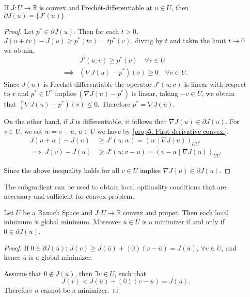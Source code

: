 \begin{theorem}
	If $J: U\rightarrow \overline{\mathbb{R}}$ is convex and Frech\'et-differentiable at $u\in U$, then $\partial J(u)=\lbrace J'(u)\rbrace$
	
	\begin{proof}
		Let $p^* \in \partial J(u)$. Then for each $t>0$, $J(u+tv)-J(u)\geq p^*(tv)=tp^*(v)$, diving by $t$ and takin the limit $t\rightarrow 0$ we obtain,
		\begin{align*}
			&J'(u;v) \geq p^*(v) \quad \forall v \in U \\
	\implies& (\nabla J(u)-p^*)(v) \geq 0 \quad \forall v \in U.
		\end{align*}
	Since $J(u)$ is Frech\'et differentiable the operator $J'(u;v)$ is linear with respect to $v$ and $p^* \in U^*$ implies $(\nabla J(u)-p^*)$ is linear, taking $-v \in U$, we obtain that $(\nabla J(u)-p^*)(v)\leq 0$. Therefore $p^*=\nabla J(u)$.
	
	On the other hand, if $J$ is differentiable, it follows that $\nabla J(u)\in \partial J(u)$. For $v\in U$, we set $w=v-u$, $u\in U$ we have by \eqref{prop5. First derivative convex.}, 
	\begin{align*}
		    J(u+w)-J(u)&\geq J'(u;w)=\left(w\mid \nabla J(u)\right)_{UU^*} \\
	\implies \ J(v)-J(u)&\geq J'(u; v-u) = \left(v-u \mid \nabla J(u)\right)_{UU^*}
	\end{align*}
	
	Since the above inequality holds for all $v \in U$ implies $\nabla J(u) \in \partial J(u)$.
	\end{proof}
\end{theorem}
\begin{remark}
	The subgradient can be used to obtain local optimality conditions that are necessary and sufficient for convex problem.
\end{remark}
\begin{theorem}
	Let $U$ be a Banach Space and $J: U \rightarrow \mathbb{R}$ convex and proper. Then each local minimum is global minimum.
	Moreover $\overline{u}\in U$ is a minimizer if and only if $0 \in \partial J(\overline{u})$.
	\begin{proof}
		If $0 \in \partial J(\overline{u})$: $J(v) \geq J(\overline{u})+ (0)(v-\overline{u})=J(\overline{u})$, $\forall v\in U$, and hence $\overline{u}$ is a global minimizer. 
		
		
		Assume that $0 \notin J(\overline{u})$, then $\exists v \in U$, such that
		\[
			J(v) < J(\overline{u}) + (0)(v-\overline{u}) = J(\overline{u}).
		\]
		Therefore $\overline{u}$ cannot be a minimizer.
	\end{proof}
\end{theorem}

